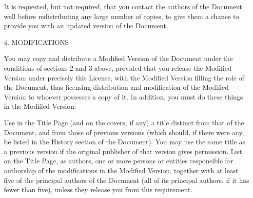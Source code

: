 \documentclass{article}
\begin{document}
It is requested, but not required, that you contact the authors of the Document well before redistributing any large number of copies, to give them a chance to provide you with an updated version of the Document. 

4. MODIFICATIONS 

You may copy and distribute a Modified Version of the Document under the conditions of sections 2 and 3 above, provided that you release the Modified Version under precisely this License, with the Modified Version filling the role of the Document, thus licensing distribution and modification of the Modified Version to whoever possesses a copy of it.  In addition, you must do these things in the Modified Version: 

Use in the Title Page (and on the covers, if any) a title distinct from that of the Document, and from those of previous versions (which should, if there were any, be listed in the History section of the Document).  You may use the same title as a previous version if the original publisher of that version gives permission.  List on the Title Page, as authors, one or more persons or entities responsible for authorship of the modifications in the Modified Version, together with at least five of the principal authors of the Document (all of its principal authors, if it has fewer than five), unless they release you from this requirement.  
\end{document}
